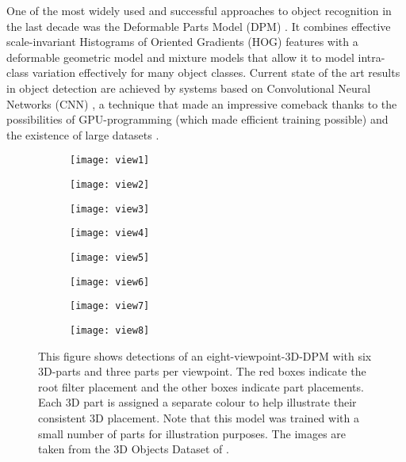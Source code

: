 One of the most widely used and successful approaches to object recognition in the last decade was the Deformable Parts Model (DPM) \cite{5255236}. It combines effective scale-invariant Histograms of Oriented Gradients (HOG) features \cite{1467360} with a deformable geometric model and mixture models that allow it to model intra-class variation effectively for many object classes. Current state of the art results in object detection are achieved by systems based on Convolutional Neural Networks (CNN) \cite{girshick2013rich}, a technique that made an impressive comeback thanks to the possibilities of GPU-programming (which made efficient training possible) and the existence of large datasets \cite{krizhevsky2012imagenet}.

\begin{figure}
\begin{center}
        \begin{subfigure}[b]{0.43\textwidth}
                \texttt{[image: view1]}
        \end{subfigure}
        \begin{subfigure}[b]{0.43\textwidth}
               \texttt{[image: view2]}
        \end{subfigure}
        \begin{subfigure}[b]{0.43\textwidth}
                \texttt{[image: view3]}
        \end{subfigure}
        \begin{subfigure}[b]{0.43\textwidth}
               \texttt{[image: view4]}
        \end{subfigure}
        \begin{subfigure}[b]{0.43\textwidth}
                \texttt{[image: view5]}
        \end{subfigure}
        \begin{subfigure}[b]{0.43\textwidth}
               \texttt{[image: view6]}
        \end{subfigure}
        \begin{subfigure}[b]{0.43\textwidth}
                \texttt{[image: view7]}
        \end{subfigure}
        \begin{subfigure}[b]{0.43\textwidth}
               \texttt{[image: view8]}
        \end{subfigure}                
\caption{This figure shows detections of an eight-viewpoint-3D-DPM with six 3D-parts and three parts per viewpoint. The red boxes indicate the root filter placement and the other boxes indicate part placements. Each 3D part is assigned a separate  colour to help illustrate their consistent 3D placement. Note that this model was trained with a small number of parts for illustration purposes. The images are taken from the 3D Objects Dataset of \cite{4408987}.}
\label{fig:carviews}
\end{center}
\end{figure}

